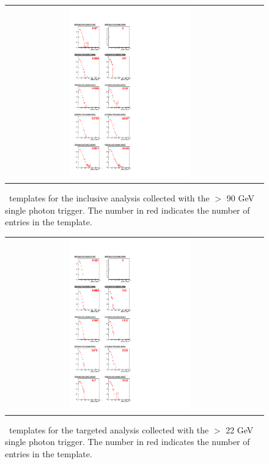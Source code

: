 \clearpage

\begin{figure}[!h]
\begin{center}
\begin{tabular}{cc}
\includegraphics[width=0.5\textwidth]{plots/template_inclusive_4.pdf}
\end{tabular}
\caption{
\MET\ templates for the inclusive analysis collected with the  \pt $>$ 90 GeV single photon trigger.
The number in red indicates the number of entries in the template.
}
\end{center}
\end{figure}

\clearpage

\begin{figure}[!h]
\begin{center}
\begin{tabular}{cc}
\includegraphics[width=0.5\textwidth]{plots/template_targeted_0.pdf}
\end{tabular}
\caption{
\MET\ templates for the targeted analysis collected with the \pt $>$ 22 GeV single photon trigger.
The number in red indicates the number of entries in the template.
}
\end{center}
\end{figure}

